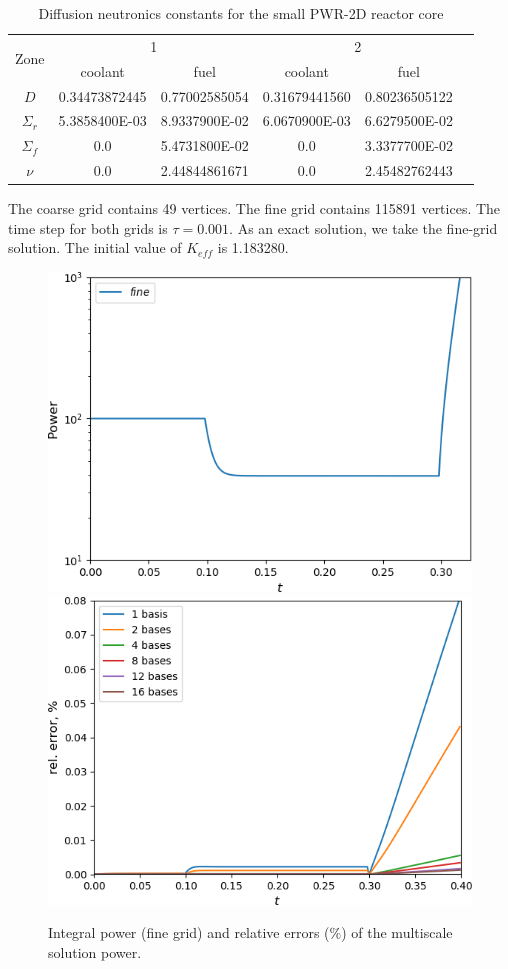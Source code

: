 \documentclass[10pt]{article}
\begin{document}
\begin{table}[h]
	\caption{Diffusion neutronics constants for the small PWR-2D reactor core}
	\label{t1}
	\begin{center}
		\begin{tabular}{|c|c|c|c|c|c|}
			\hline
			\multirow{2}{*}{Zone} & \multicolumn{2}{c|}{1} & \multicolumn{2}{c|}{2} \\
			\cline{2-5}
						 & coolant		 & fuel 		 & coolant 		 & fuel \\
			\hline
			$D$ 		 & 0.34473872445 & 0.77002585054 & 0.31679441560 & 0.80236505122 \\
			$\Sigma_r$ 	 & 5.3858400E-03 & 8.9337900E-02 & 6.0670900E-03 & 6.6279500E-02 \\
			$\Sigma_{f}$ & 0.0 			 & 5.4731800E-02 & 0.0 			 & 3.3377700E-02 \\
			$\nu$ 		 & 0.0 			 & 2.44844861671 & 0.0 			 & 2.45482762443 \\
			\hline
		\end{tabular}
	\end{center}
\end{table}

The coarse grid contains 49 vertices.
The fine grid contains 115891 vertices.
The time step for both grids is $\tau = 0.001$.
As an exact solution, we take the fine-grid solution.
The initial value of $K_{eff}$ is 1.183280.

\begin{figure}[h!]
	\centering
		\includegraphics[width=0.45\linewidth]{power_fine.png} \hspace{2em}
		\includegraphics[width=0.45\linewidth]{power.png}
	\caption{Integral power (fine grid) and relative errors ($\%$) of the multiscale solution power.}
	\label{p4}
\end{figure}
 
\end{document}
